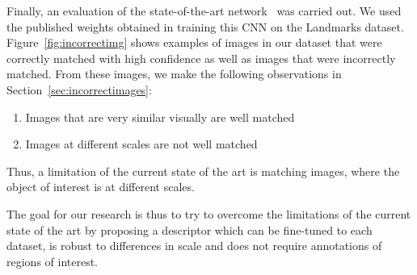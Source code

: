 Finally, an evaluation of the state-of-the-art network~\cite{gordo_deep_2016}
was carried out.
We used the published weights obtained in training this CNN on the
Landmarks dataset.
Figure~\ref{fig:incorrectimg}
shows examples of images in our dataset that were correctly matched
with high confidence as well as images that were incorrectly matched.
From these images, we make the following observations in
Section~\ref{sec:incorrectimages}:

\begin{enumerate}
    \item Images that are very similar visually are well matched
    \item Images at different scales are not well matched
\end{enumerate}

Thus, a limitation of the current state of the art is matching
images, where the object of interest is at different scales.

The goal for our research is thus to try to overcome the limitations
of the current state of the art by proposing a descriptor which can
be fine-tuned to each dataset, is robust to differences in scale and
does not require annotations of regions of interest.
